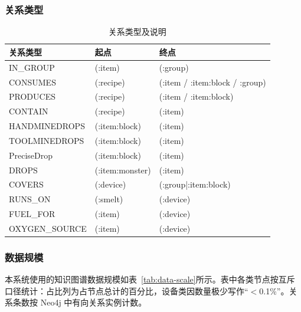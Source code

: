 \documentclass[12pt,a4paper]{article}
\begin{document}
\subsubsection{关系类型}

\begin{table}[H]
    \centering
    \caption{关系类型及说明}
    \label{tab:rel-types}
    \begin{tabular}{lll}
        \toprule
        \textbf{关系类型} & \textbf{起点} & \textbf{终点} \\
        \midrule
        IN\_GROUP & (:item) & (:group) \\
        CONSUMES & (:recipe) & (:item / :item:block / :group) \\
        PRODUCES & (:recipe) & (:item / :item:block) \\
        CONTAIN & (:recipe) & (:item) \\
        HANDMINEDROPS & (:item:block) & (:item) \\
        TOOLMINEDROPS & (:item:block) & (:item) \\
        PreciseDrop & (:item:block) & (:item) \\
        DROPS & (:item:monster) & (:item) \\
        COVERS & (:device) & (:group|:item:block) \\
        RUNS\_ON & (:smelt) & (:device) \\
        FUEL\_FOR & (:item) & (:device) \\
        OXYGEN\_SOURCE & (:item) & (:device) \\
        \bottomrule
    \end{tabular}
\end{table}

\subsubsection{数据规模}

本系统使用的知识图谱数据规模如表~\ref{tab:data-scale}所示。表中各类节点按互斥口径统计：占比列为占节点总计的百分比，设备类因数量极少写作``$<$0.1\%''。关系条数按 Neo4j 中有向关系实例计数。
\end{document}
